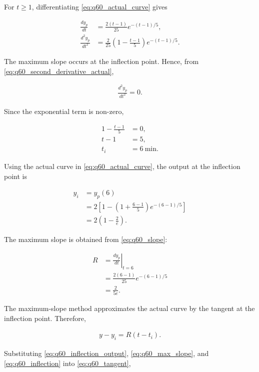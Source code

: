 \begin{enumerate}[label=\thesubsection.\arabic*, ref=\thesubsection.\theenumi,itemsep=0pt]
For $t\geq1$, differentiating \eqref{eq:q60_actual_curve} gives

\begin{align}
\frac{dy_p}{dt}
&=
\frac{2(t-1)}{25}e^{-(t-1)/5},
\label{eq:q60_slope}
\\
\frac{d^2y_p}{dt^2}
&=
\frac{2}{25}
\left(1-\frac{t-1}{5}\right)
e^{-(t-1)/5}.
\label{eq:q60_second_derivative_actual}
\end{align}

The maximum slope occurs at the inflection point. Hence, from
\eqref{eq:q60_second_derivative_actual},

\begin{align}
\frac{d^2y_p}{dt^2}=0.
\end{align}

Since the exponential term is non-zero,

\begin{align}
1-\frac{t-1}{5}&=0,
\\
t-1&=5,
\\
t_i&=6~\text{min}.
\label{eq:q60_inflection}
\end{align}

Using the actual curve in \eqref{eq:q60_actual_curve}, the output at
the inflection point is

\begin{align}
y_i
&=y_p(6)
\\
&=
2\left[
1-\left(1+\frac{6-1}{5}\right)
e^{-(6-1)/5}
\right]
\\
&=
2\left(1-\frac{2}{e}\right).
\label{eq:q60_inflection_output}
\end{align}

The maximum slope is obtained from \eqref{eq:q60_slope}:

\begin{align}
R
&=
\left.\frac{dy_p}{dt}\right|_{t=6}
\\
&=
\frac{2(6-1)}{25}
e^{-(6-1)/5}
\\
&=
\frac{2}{5e}.
\label{eq:q60_max_slope}
\end{align}

The maximum-slope method approximates the actual curve by the tangent
at the inflection point. Therefore,

\begin{align}
y-y_i=R(t-t_i).
\label{eq:q60_tangent}
\end{align}

Substituting \eqref{eq:q60_inflection_output},
\eqref{eq:q60_max_slope}, and \eqref{eq:q60_inflection} into
\eqref{eq:q60_tangent},


\end{enumerate}
